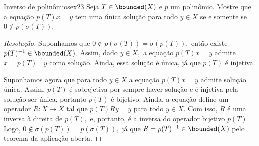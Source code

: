 \begin{exercício}{Inverso de polinômios}{ex23}
    Seja \(T \in \bounded(X)\) e \(p\) um polinômio. Mostre que a equação \(p(T)x = y\) tem uma única solução para todo \(y \in X\) se e somente se \(0 \notin p(\sigma(T)).\)
\end{exercício}
\begin{proof}[Resolução]
  Suponhamos que \(0 \notin p(\sigma(T)) = \sigma(p(T)),\) então existe \(p(T)^{-1} \in \bounded(X).\) Assim, dado \(y \in X,\) a equação \(p(T)x = y\) admite \(x = p(T)^{-1}y\) como solução. Ainda, essa solução é única, já que \(p(T)\) é injetiva.

  Suponhamos agora que para todo \(y \in X\) a equação \(p(T)x = y\) admite solução única. Assim, \(p(T)\) é sobrejetiva por sempre haver solução e é injetiva pela solução ser única, portanto \(p(T)\) é bijetivo. Ainda, a equação define um operador \(R : X \to X\) tal que \(p(T)Ry = y\) para todo \(y \in X.\) Com isso, \(R\) é uma inversa à direita de \(p(T),\) e, portanto, é a inversa do operador bijetivo \(p(T)\). Logo, \(0 \notin \sigma(p(T)) = p(\sigma(T)),\) já que \(R = p(T)^{-1} \in \bounded(X)\) pelo teorema da aplicação aberta.
\end{proof}

